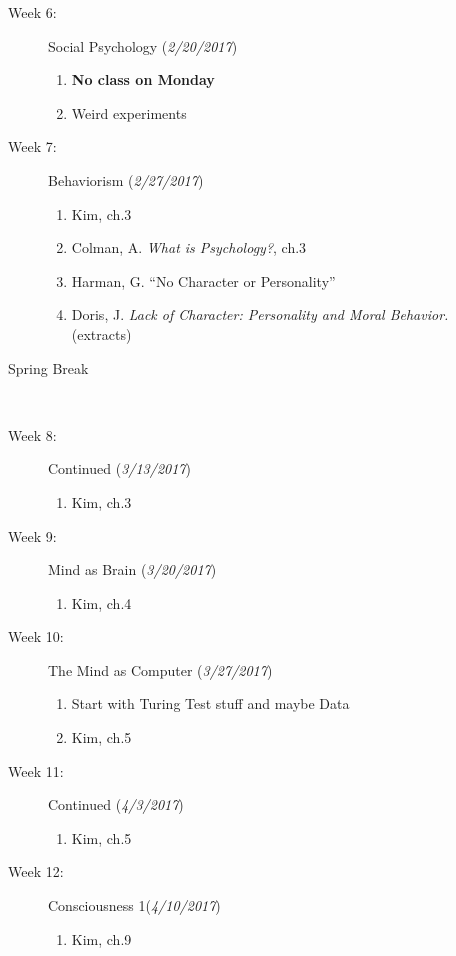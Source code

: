 \documentclass[article,oneside]{memoir}
\begin{document}
\begin{description}
\item[Week 6:] Social Psychology (\emph{2/20/2017})
\begin{enumerate}
\item \textbf{No class on Monday}
\item Weird experiments
\end{enumerate}

\item[Week 7:] Behaviorism (\emph{2/27/2017})
\begin{enumerate}
\item Kim, ch.3
\item Colman, A.  \emph{What is Psychology?}, ch.3
\item Harman, G. ``No Character or Personality''
\item Doris, J. \emph{Lack of Character: Personality and Moral Behavior.} (extracts)
\end{enumerate}

\item[Spring Break]\


\item[Week 8:] Continued (\emph{3/13/2017})
\begin{enumerate}
\item Kim, ch.3
\end{enumerate}

\item[Week 9:] Mind as Brain (\emph{3/20/2017})
\begin{enumerate}
\item Kim, ch.4
\end{enumerate}


\item[Week 10:] The Mind as Computer (\emph{3/27/2017})
\begin{enumerate}
\item Start with Turing Test stuff and maybe Data 
\item Kim, ch.5
\end{enumerate}

\item[Week 11:] Continued (\emph{4/3/2017})
\begin{enumerate}
\item Kim, ch.5
\end{enumerate}

\item[Week 12:]{Consciousness 1}(\emph{4/10/2017})
\begin{enumerate}
\item Kim, ch.9
\end{enumerate}



\end{description}
\end{document}
